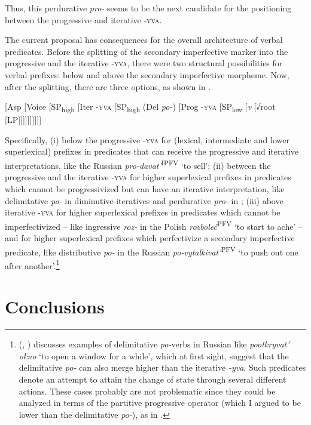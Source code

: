\documentclass[output=paper,colorlinks,citecolor=brown]{langscibook}
\begin{document}
\noindent Thus, this perdurative \textit{pro-} seems to be the next candidate for the positioning between the progressive and iterative \textsc{-yva}.

The current proposal has consequences for the overall architecture of verbal predicates. Before the splitting of the secondary imperfective marker into the progressive and the iterative \textsc{-yva}, there were two structural possibilities for verbal prefixes: below and above the secondary imperfective morpheme. Now, after the splitting, there are three options, as shown in .

\ea\label{biskup:ex:ctyridevet}
[Asp [Voice [SP\textsubscript{high} [Iter \textsc{-yva} [SP\textsubscript{high} (Del \textit{po-}) [Prog \textsc{-yva} [SP\textsubscript{low} [\textit{v} [√root [LP]]]]]]]]]]
\z

\noindent Specifically, (i) below the progressive \textsc{-yva} for (lexical, intermediate and lower superlexical) prefixes in predicates that can receive the progressive and iterative interpretations, like the Russian \textit{pro-davat'}\textsuperscript{IPFV} ‘to sell’; (ii) between the progressive and the iterative \textsc{-yva} for higher superlexical prefixes in predicates which cannot be progressivized but can have an iterative interpretation, like delimitative \textit{po-} in diminutive-iteratives and perdurative \textit{pro-} in ; (iii) above iterative \textsc{-yva} for higher superlexical prefixes in predicates which cannot be imperfectivized -- like ingressive \textit{roz-} in the Polish \textit{rozboleć}\textsuperscript{PFV} ‘to start to ache’ -- and for higher superlexical prefixes which perfectivize a secondary imperfective predicate, like distributive \textit{po-} in the Russian \textit{po-vytalkivat'}\textsuperscript{PFV} ‘to push out one after another’.\footnote{\citeauthor{Mehlig2007} (\citeyear{Mehlig2007}, \citeyear{bis:Mehlig2012}) discusses examples of delimitative \textit{po-}verbs in Russian like \textit{pootkryvat’ okno} ‘to open a window for a while’, which at first sight, suggest that the delimitative \textit{po-} can also merge higher than the iterative \textit{-yva}. Such predicates denote an attempt to attain the change of state through several different actions. These cases probably are not problematic since they could be analyzed in terms of the partitive progressive operator (which I argued to be lower than the delimitative \textit{po-}), as in \citet{TatevosovIvanov2009}.}

\section{Conclusions} \label{biskup:sec:conclusions}
\end{document}
